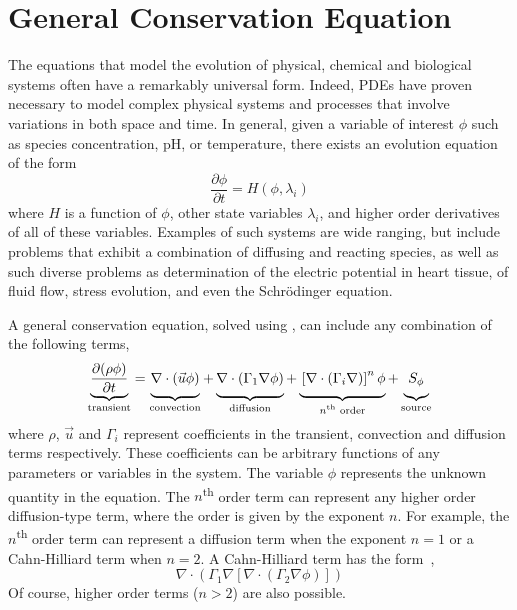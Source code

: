 \section{General Conservation Equation}
\label{sec:GeneralConservationEquation}

The equations that model the evolution of physical, chemical and
biological systems often have a remarkably universal form.  Indeed,
PDEs have proven necessary to model complex physical systems and
processes that involve variations in both space and time.  In general,
given a variable of interest \( \phi \) such as species concentration,
pH, or temperature, there exists an evolution equation of the form
\begin{equation}
  \frac{\partial \phi}{\partial t} = H(\phi, \lambda_i)
  \label{eqn:general-equation}
\end{equation}
where \( H \) is a function of \(\phi\), other state variables
\(\lambda_i\), and higher order derivatives of all of these variables.
Examples of such systems are wide ranging, but include problems that
exhibit a combination of diffusing and reacting species, as well as
such diverse problems as determination of the electric potential in
heart tissue, of fluid flow, stress evolution, and even the
Schr\"odinger equation.

A general conservation equation, solved using \FiPy{}, can include any
combination of the following terms,
\begin{equation}                        
  \underbrace{
  \frac{\partial (\rho \phi)}{\partial t}
  }_{\text{transient}}
=
\underbrace{
  \vphantom{\frac{\partial (\rho \phi)}{\partial t}}
  \nabla \cdot \left( \vec{u} \phi \right)
}_{\text{convection}}
+
\underbrace{
  \vphantom{\frac{\partial (\rho \phi)}{\partial t}}
  \nabla \cdot \left( \Gamma_1 \nabla \phi \right) 
}_{\text{diffusion}}
+
\underbrace{
  \vphantom{\frac{\partial (\rho \phi)}{\partial t}}
  \left[ \nabla \cdot \left( \Gamma_i \nabla \right) \right]^n \phi
}_{\text{$n$\textsuperscript{th} order}}
+
\underbrace{
  \vphantom{\frac{\partial (\rho \phi)}{\partial t}}
  S_{\phi}
}_{\text{source}}
\label{eqn:num:gen}
\end{equation}
where $\rho$, $\vec{u}$ and $\Gamma_i$ represent coefficients in the
transient, convection and diffusion terms respectively.  These
coefficients can be arbitrary functions of any parameters or variables
in the system.  The variable $\phi$ represents the unknown quantity
in the equation.  The $n$\textsuperscript{th} order term can represent
any higher order diffusion-type term, where the order is given by the
exponent $n$.  For example, the $n$\textsuperscript{th} order term can
represent a diffusion term when the exponent $n = 1$ or a
Cahn-Hilliard term when $n = 2$.  A Cahn-Hilliard term has the
form~\cite{CahnHilliardI,CahnHilliardII,CahnHilliardIII},
\begin{equation}
  \nabla \cdot \left( \Gamma_1 \nabla \left[ 
  \nabla \cdot \left( \Gamma_2 \nabla \phi \right) \right] \right)
  \label{eqn:cahn-hilliard}
\end{equation}
Of course, higher order terms ($n > 2$) are also possible.



